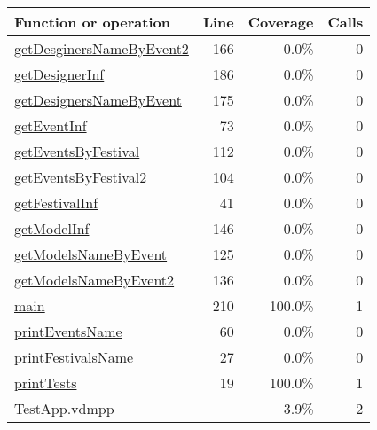 \begin{longtable}{|l|r|r|r|}
\hline
Function or operation & Line & Coverage & Calls \\
\hline
\hline
\hyperref[getDesginersNameByEvent2:166]{getDesginersNameByEvent2} & 166&0.0\% & 0 \\
\hline
\hyperref[getDesignerInf:186]{getDesignerInf} & 186&0.0\% & 0 \\
\hline
\hyperref[getDesignersNameByEvent:175]{getDesignersNameByEvent} & 175&0.0\% & 0 \\
\hline
\hyperref[getEventInf:73]{getEventInf} & 73&0.0\% & 0 \\
\hline
\hyperref[getEventsByFestival:112]{getEventsByFestival} & 112&0.0\% & 0 \\
\hline
\hyperref[getEventsByFestival2:104]{getEventsByFestival2} & 104&0.0\% & 0 \\
\hline
\hyperref[getFestivalInf:41]{getFestivalInf} & 41&0.0\% & 0 \\
\hline
\hyperref[getModelInf:146]{getModelInf} & 146&0.0\% & 0 \\
\hline
\hyperref[getModelsNameByEvent:125]{getModelsNameByEvent} & 125&0.0\% & 0 \\
\hline
\hyperref[getModelsNameByEvent2:136]{getModelsNameByEvent2} & 136&0.0\% & 0 \\
\hline
\hyperref[main:210]{main} & 210&100.0\% & 1 \\
\hline
\hyperref[printEventsName:60]{printEventsName} & 60&0.0\% & 0 \\
\hline
\hyperref[printFestivalsName:27]{printFestivalsName} & 27&0.0\% & 0 \\
\hline
\hyperref[printTests:19]{printTests} & 19&100.0\% & 1 \\
\hline
\hline
TestApp.vdmpp & & 3.9\% & 2 \\
\hline
\end{longtable}

